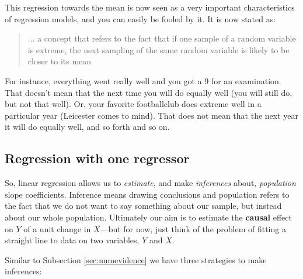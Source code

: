 \documentclass[
]{book}
\begin{document}
This regression towards the mean is now seen as a very important characteristics of regression models, and you can easily be fooled by it. It is now stated as:

\begin{quote}
\(\ldots\) a concept that refers to the fact that if one sample of a random variable is extreme, the next sampling of the same random variable is likely to be closer to its mean
\end{quote}

For instance, everything went really well and you got a 9 for an examination. That doesn't mean that the next time you will do equally well (you will still do, but not that well). Or, your favorite footballclub does extreme well in a particular year (Leicester comes to mind). That does not mean that the next year it will do equally well, and so forth and so on.

\hypertarget{regression-with-one-regressor}{%
\subsection{Regression with one regressor}\label{regression-with-one-regressor}}

So, linear regression allows us to \emph{estimate}, and make \emph{inferences} about, \emph{population} slope coefficients. Inference means drawing conclusions and population refers to the fact that we do not want to say something about our sample, but instead about our whole population. Ultimately our aim
is to estimate the \textbf{causal} effect on \(Y\) of a unit change in \(X\)---but for now, just think of the problem of fitting a straight line to data on two variables, \(Y\) and \(X\).

Similar to Subsection \ref{sec:numevidence} we have three strategies to make inferences:
\end{document}
